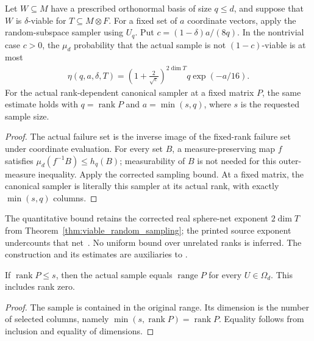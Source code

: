 \begin{theorem}
    \label{thm:rank_product_sampling_failure}
    \leanok
    Let $W\subseteq M$ have a prescribed orthonormal basis of size
    $q\le d$, and suppose that $W$ is $\delta$-viable for
    $T\subseteq M\otimes F$. For a fixed set of $a$ coordinate vectors,
    apply the random-subspace sampler using $U_q$.
    Put $c=(1-\delta)a/(8q)$. In the nontrivial case $c>0$, the
    $\mu_d$ probability that the actual sample is not $(1-c)$-viable is
    at most
    \begin{align}
        \eta(q,a,\delta,T)
        =\left(1+\frac2{\sqrt c}\right)^{2\dim T}
        q\exp(-a/16).
    \end{align}
    For the actual rank-dependent canonical sampler at a fixed matrix
    $P$, the same estimate holds with $q=\operatorname{rank}P$ and
    $a=\min(s,q)$, where $s$ is the requested sample size.
\end{theorem}
\begin{proof}\leanok
    The actual failure set is the inverse image of the fixed-rank
    failure set under coordinate evaluation. For every set $B$, a
    measure-preserving map $f$ satisfies
    $\mu_d(f^{-1}B)\le h_q(B)$; measurability of $B$ is not needed for
    this outer-measure inequality. Apply the corrected sampling
    bound. At a fixed matrix, the canonical sampler is literally this
    sampler at its actual rank, with exactly $\min(s,q)$ columns.
\end{proof}

The quantitative bound retains the corrected real sphere-net exponent
$2\dim T$ from Theorem~\ref{thm:viable_random_sampling}; the printed
source exponent undercounts that net~\cite{gap:alvv16_random_sampling_net_count}.
No uniform bound over unrelated ranks is inferred. The construction and
its estimates are auxiliaries to
\cite[Lemma \texttt{l:rs}, lines 530--558]{Arad2016RigorousRG}.

\begin{theorem}
    \label{thm:rank_product_full_sample}
    \leanok
    If $\operatorname{rank}P\le s$, then the actual sample equals
    $\operatorname{range}P$ for every $U\in\Omega_d$.
    This includes rank zero.
\end{theorem}
\begin{proof}\leanok
    The sample is contained in the original range. Its dimension is
    the number of selected columns, namely
    $\min(s,\operatorname{rank}P)=\operatorname{rank}P$.
    Equality follows from inclusion and equality of dimensions.
\end{proof}

